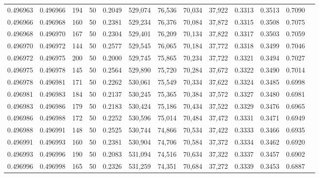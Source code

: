 \begin{tabular}{rrrrrrrrrrrrr}
0.496963 & 0.496966 &   194 &  50 &                                     0.2049 & 529,074 &  76,536 &  70,034 &  37,922 & 0.3313 & 0.3513 & 0.7090 \\
0.496966 & 0.496968 &   160 &  50 &                                     0.2381 & 529,234 &  76,376 &  70,084 &  37,872 & 0.3315 & 0.3508 & 0.7075 \\
0.496968 & 0.496970 &   167 &  50 &                                     0.2304 & 529,401 &  76,209 &  70,134 &  37,822 & 0.3317 & 0.3503 & 0.7059 \\
0.496970 & 0.496972 &   144 &  50 &                                     0.2577 & 529,545 &  76,065 &  70,184 &  37,772 & 0.3318 & 0.3499 & 0.7046 \\
0.496972 & 0.496975 &   200 &  50 &                                     0.2000 & 529,745 &  75,865 &  70,234 &  37,722 & 0.3321 & 0.3494 & 0.7027 \\
0.496975 & 0.496978 &   145 &  50 &                                     0.2564 & 529,890 &  75,720 &  70,284 &  37,672 & 0.3322 & 0.3490 & 0.7014 \\
0.496978 & 0.496981 &   171 &  50 &                                     0.2262 & 530,061 &  75,549 &  70,334 &  37,622 & 0.3324 & 0.3485 & 0.6998 \\
0.496981 & 0.496983 &   184 &  50 &                                     0.2137 & 530,245 &  75,365 &  70,384 &  37,572 & 0.3327 & 0.3480 & 0.6981 \\
0.496983 & 0.496986 &   179 &  50 &                                     0.2183 & 530,424 &  75,186 &  70,434 &  37,522 & 0.3329 & 0.3476 & 0.6965 \\
0.496986 & 0.496988 &   172 &  50 &                                     0.2252 & 530,596 &  75,014 &  70,484 &  37,472 & 0.3331 & 0.3471 & 0.6949 \\
0.496988 & 0.496991 &   148 &  50 &                                     0.2525 & 530,744 &  74,866 &  70,534 &  37,422 & 0.3333 & 0.3466 & 0.6935 \\
0.496991 & 0.496993 &   160 &  50 &                                     0.2381 & 530,904 &  74,706 &  70,584 &  37,372 & 0.3334 & 0.3462 & 0.6920 \\
0.496993 & 0.496996 &   190 &  50 &                                     0.2083 & 531,094 &  74,516 &  70,634 &  37,322 & 0.3337 & 0.3457 & 0.6902 \\
0.496996 & 0.496998 &   165 &  50 &                                     0.2326 & 531,259 &  74,351 &  70,684 &  37,272 & 0.3339 & 0.3453 & 0.6887 \\

\end{tabular}
